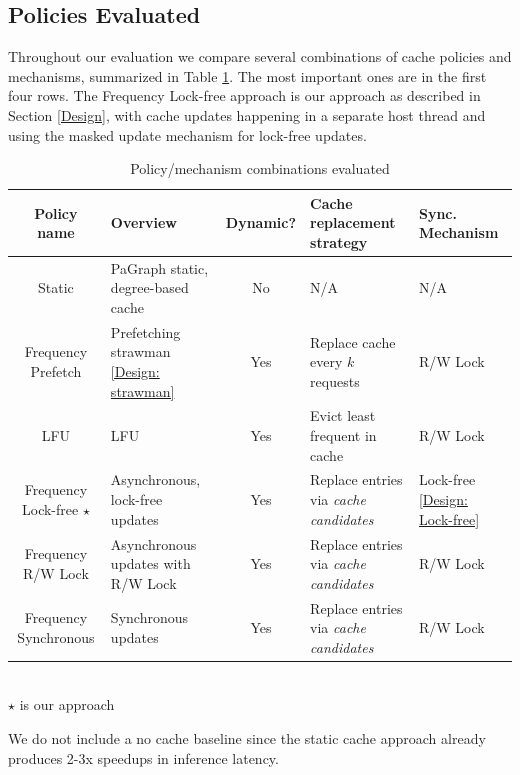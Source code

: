 \subsection{Policies Evaluated}
Throughout our evaluation we compare several combinations of cache policies and mechanisms, summarized in Table \ref{Eval: Policy names}. The most important ones are in the first four rows. The Frequency Lock-free approach is our approach as described in Section \ref{Design}, with cache updates happening in a separate host thread and using the masked update mechanism for lock-free updates.
\begin{table}[h!]
    \begin{center}
        \begin{tabularx}{\textwidth}{|c X c X X|} 
        \hline
        \textbf{Policy name} & \textbf{Overview} & \textbf{Dynamic?} & \textbf{Cache replacement strategy} & \textbf{Sync. Mechanism}\\ [0.5ex] 
        \hline\hline
        Static & PaGraph static, degree-based cache & No & N/A & N/A \\
        \hline
        Frequency Prefetch & Prefetching strawman \ref{Design: strawman} & Yes & Replace cache every $k$ requests & R/W Lock \\
        \hline
        LFU & LFU & Yes & Evict least frequent in cache & R/W Lock \\
        \hline
        Frequency Lock-free $\star$ & Asynchronous, lock-free updates & Yes & Replace entries via \textit{cache candidates} & Lock-free \ref{Design: Lock-free} \\
        \hline
        Frequency R/W Lock & Asynchronous updates with R/W Lock & Yes & Replace entries via \textit{cache candidates} & R/W Lock \\
        \hline
        Frequency Synchronous & Synchronous updates & Yes & Replace entries via \textit{cache candidates} & R/W Lock \\
        \hline
        \end{tabularx} \\
        $\star$ is our approach
    \end{center}
    \caption{Policy/mechanism combinations evaluated}
    \label{Eval: Policy names}
\end{table}
We do not include a no cache baseline since the static cache approach already produces 2-3x speedups in inference latency.

